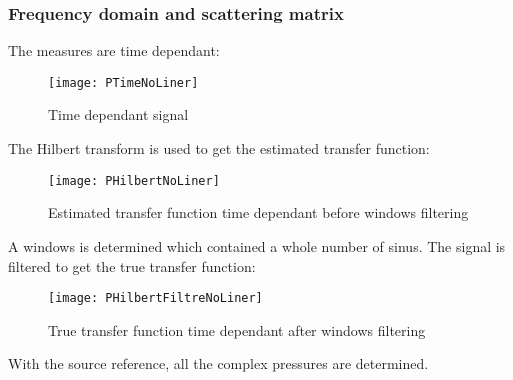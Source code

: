 \subsubsection{Frequency domain and scattering matrix}
The measures are time dependant: 
\begin{figure}[H] \centering
    \texttt{[image: PTimeNoLiner]}
    \caption{Time dependant signal}
\end{figure}
The Hilbert transform is used to get the estimated transfer function:
\begin{figure}[H] \centering
    \texttt{[image: PHilbertNoLiner]}
    \caption{Estimated transfer function time dependant before windows filtering}
\end{figure}
A windows is determined which contained a whole number of sinus. The signal is filtered to get the true transfer function:
\begin{figure}[H] \centering
    \texttt{[image: PHilbertFiltreNoLiner]}
    \caption{True transfer function time dependant after windows filtering}
\end{figure}
With the source reference, all the complex pressures are determined.
